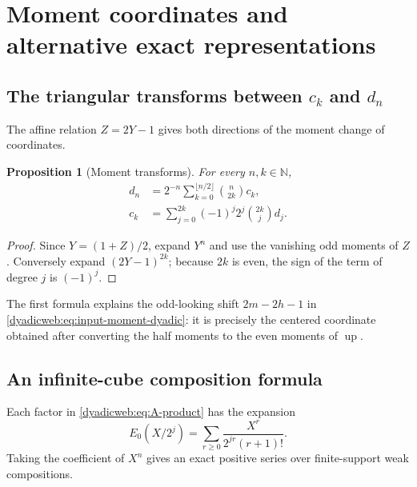 \documentclass[11pt,oneside]{article}
\newtheorem{proposition}[theorem]{Proposition}
\theoremstyle{definition}
\theoremstyle{remark}
\newcommand{\N}{\mathbb N}
\newcommand{\Up}{\operatorname{up}}
\begin{document}
\section{Moment coordinates and alternative exact representations}
\label{dyadicweb:sec:moment-alternatives}

\subsection[The triangular transforms between the c and d sequences]{The triangular transforms between $c_k$ and $d_n$}

The affine relation $Z=2Y-1$ gives both directions of the moment change of coordinates.

\begin{proposition}[Moment transforms]
\label{dyadicweb:prop:moment-transforms}
For every $n,k\in\N$,
\begin{align}
 d_n
 &=2^{-n}\sum_{k=0}^{\lfloor n/2\rfloor}\binom n{2k}c_k,
                                                               \label{dyadicweb:eq:d-from-c-new}\\
 c_k
 &=\sum_{j=0}^{2k}(-1)^j2^j\binom{2k}{j}d_j.              \label{dyadicweb:eq:c-from-d-new}
\end{align}
\end{proposition}

\begin{proof}
Since $Y=(1+Z)/2$, expand $Y^n$ and use the vanishing odd moments of $Z$.  Conversely expand
$(2Y-1)^{2k}$; because $2k$ is even, the sign of the term of degree $j$ is $(-1)^j$.
\end{proof}

The first formula explains the odd-looking shift $2m-2h-1$ in
\eqref{dyadicweb:eq:input-moment-dyadic}: it is precisely the centered coordinate obtained after
converting the half moments to the even moments of $\Up$.

\subsection{An infinite-cube composition formula}

Each factor in \eqref{dyadicweb:eq:A-product} has the expansion
\[
 E_0(X/2^j)=\sum_{r\ge0}\frac{X^r}{2^{jr}(r+1)!}.
\]
Taking the coefficient of $X^n$ gives an exact positive series over finite-support weak
compositions.
\end{document}
